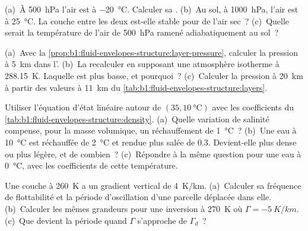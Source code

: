 \begin{exercise}[$\star\star$]\label{exo:b1:fluid-envelopes-structure:5}
(a)~À \qty{500}{hPa} l'air est à \qty{-20}{\celsius}. Calculer sa . (b)~Au sol, à \qty{1000}{hPa}, l'air est à
\qty{25}{\celsius}. La couche entre les deux est-elle stable pour de l'air sec~? (c)~Quelle
serait la température de l'air de \qty{500}{hPa} ramené adiabatiquement au
sol~?
\end{exercise}

\begin{exercise}[$\star\star$]\label{exo:b1:fluid-envelopes-structure:6}
(a)~Avec la \cref{prop:b1:fluid-envelopes-structure:layer-pressure}, calculer la
pression à \qty{5}{km} dans l'. (b)~La recalculer en supposant
une atmosphère isotherme à \qty{288.15}{K}. Laquelle est plus basse, et pourquoi~? (c)~Calculer
la pression à \qty{20}{km} à partir des valeurs à \qty{11}{km} du
\cref{tab:b1:fluid-envelopes-structure:layers}.
\end{exercise}

\begin{exercise}[$\star\star$]\label{exo:b1:fluid-envelopes-structure:7}
Utiliser l'équation d'état linéaire autour de $(35, \qty{10}{\celsius})$ avec les
coefficients du \cref{tab:b1:fluid-envelopes-structure:density}. (a)~Quelle variation
de salinité compense, pour la masse volumique, un réchauffement de \qty{1}{\celsius}~?
(b)~Une eau à \qty{10}{\celsius} est réchauffée de \qty{2}{\celsius} et rendue plus salée
de \num{0.3}. Devient-elle plus dense ou plus légère, et de combien~? (c)~Répondre à la
même question pour une eau à \qty{0}{\celsius}, avec les coefficients de cette
température.
\end{exercise}

\begin{exercise}[$\star\star$]\label{exo:b1:fluid-envelopes-structure:8}
Une couche à \qty{260}{K} a un gradient vertical de \qty{4}{K/km}. (a)~Calculer sa
fréquence de flottabilité et la période d'oscillation d'une parcelle déplacée dans
elle. (b)~Calculer les mêmes grandeurs pour une inversion à \qty{270}{K} où
$\Gamma = \qty{-5}{K/km}$. (c)~Que devient la période quand $\Gamma$ s'approche de
$\Gamma_d$~?
\end{exercise}

